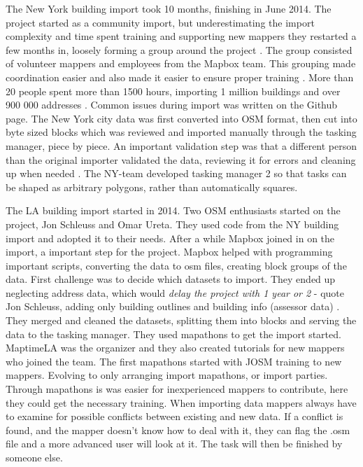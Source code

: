 The New York building import took 10 months, finishing in June 2014. The project started as a community import, but underestimating the import complexity and time spent training and supporting new mappers they restarted a few months in, loosely forming a group around the project \cite{Barth2014}. The group consisted of volunteer mappers and employees from the Mapbox team. This grouping made coordination easier and also made it easier to ensure proper training \cite{Barth2014a}. More than 20 people spent more than 1500 hours, importing 1 million buildings and over 900 000 addresses \cite{Barth2014}. Common issues during import was written on the Github page. The New York city data was first converted into OSM format, then cut into byte sized blocks which was reviewed and imported manually through the tasking manager, piece by piece. An important validation step was that a different person than the original importer validated the data, reviewing it for errors and cleaning up when needed \cite{Barth2014}. The NY-team developed tasking manager 2 so that tasks can be shaped as arbitrary polygons, rather than automatically squares. 

The LA building import started in 2014. Two OSM enthusiasts started on the project, Jon Schleuss and Omar Ureta. They used code from the NY building import and adopted it to their needs. After a while Mapbox joined in on the import, a important step for the project. Mapbox helped with programming important scripts, converting the data to osm files, creating block groups of the data. First challenge was to decide which datasets to import.  They ended up neglecting address data, which would \textit{delay the project with 1 year or 2} - quote Jon Schleuss, adding only building outlines and building info (assessor data) \cite{Schleuss2016}. They merged and cleaned the datasets, splitting them into blocks and serving the data to the tasking manager. They used mapathons to get the import started. MaptimeLA was the organizer and they also created tutorials for new mappers who joined the team. The first mapathons started with JOSM training to new mappers. Evolving to only arranging import mapathons, or import parties. Through mapathons is was easier for inexperienced mappers to contribute, here they could get the necessary training.  When importing data mappers always have to examine for possible conflicts between existing and new data. If a conflict is found, and the mapper doesn't know how to deal with it, they can flag the .osm file and a more advanced user will look at it. The task will then be finished by someone else. 

